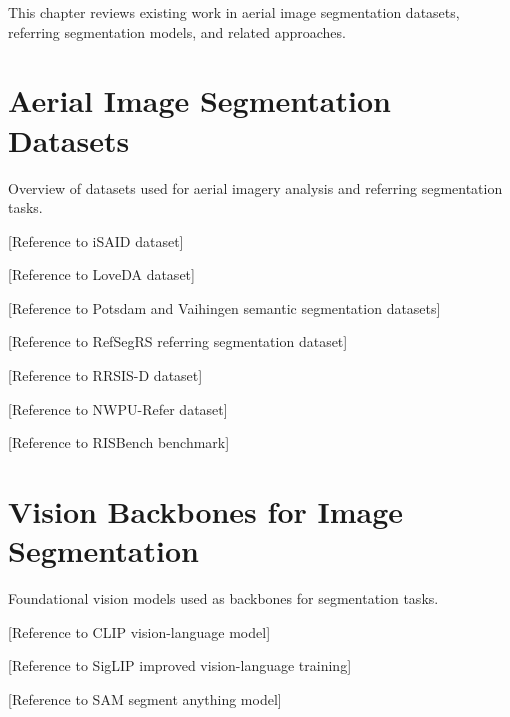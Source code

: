 \cleardoublepage
\label{chap:architecture}

This chapter reviews existing work in aerial image segmentation datasets, referring segmentation models, and related approaches.

\section{Aerial Image Segmentation Datasets}

Overview of datasets used for aerial imagery analysis and referring segmentation tasks.

[Reference to iSAID dataset] %

[Reference to LoveDA dataset] %

[Reference to Potsdam and Vaihingen semantic segmentation datasets] %

[Reference to RefSegRS referring segmentation dataset] %

[Reference to RRSIS-D dataset] %

[Reference to NWPU-Refer dataset] %

[Reference to RISBench benchmark] %

\section{Vision Backbones for Image Segmentation}

Foundational vision models used as backbones for segmentation tasks.

[Reference to CLIP vision-language model] %

[Reference to SigLIP improved vision-language training] %

[Reference to SAM segment anything model] %

